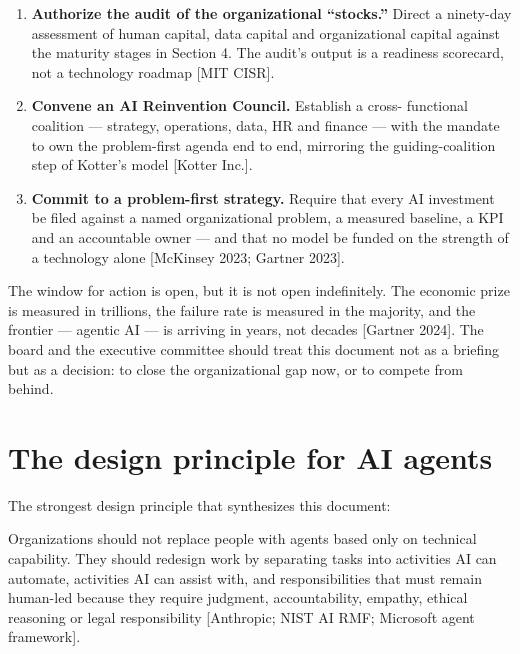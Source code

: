 \begin{enumerate}
  \item \textbf{Authorize the audit of the organizational ``stocks.''} Direct
        a ninety-day assessment of human capital, data capital and
        organizational capital against the maturity stages in Section 4. The
        audit's output is a readiness scorecard, not a technology roadmap
        [MIT CISR].
  \item \textbf{Convene an AI Reinvention Council.} Establish a cross-
        functional coalition — strategy, operations, data, HR and finance —
        with the mandate to own the problem-first agenda end to end, mirroring
        the guiding-coalition step of Kotter's model [Kotter Inc.].
  \item \textbf{Commit to a problem-first strategy.} Require that every AI
        investment be filed against a named organizational problem, a measured
        baseline, a KPI and an accountable owner — and that no model be funded
        on the strength of a technology alone [McKinsey 2023; Gartner 2023].
\end{enumerate}

\vspace{1em}
\begin{center}
\end{center}

\vspace{0.5em}
\noindent The window for action is open, but it is not open indefinitely. The
economic prize is measured in trillions, the failure rate is measured in the
majority, and the frontier — agentic AI — is arriving in years, not decades
[Gartner 2024]. The board and the executive committee should treat this
document not as a briefing but as a decision: to close the organizational gap
now, or to compete from behind.

\section{The design principle for AI agents}

The strongest design principle that synthesizes this document:

\begin{center}
\end{center}

Organizations should not replace people with agents based only on technical
capability. They should redesign work by separating tasks into activities AI
can automate, activities AI can assist with, and responsibilities that must
remain human-led because they require judgment, accountability, empathy,
ethical reasoning or legal responsibility [Anthropic; NIST AI RMF; Microsoft
agent framework].
